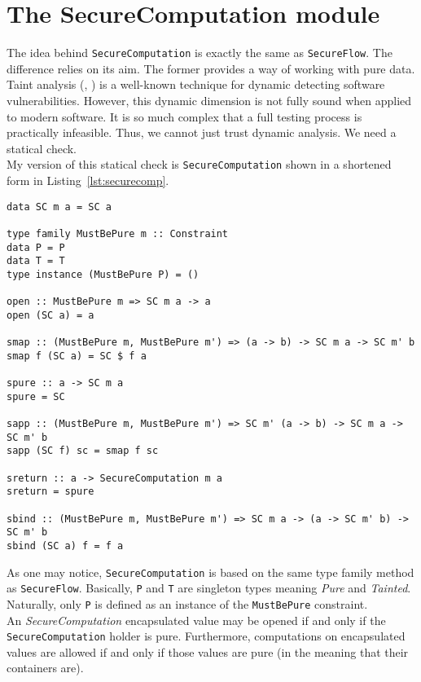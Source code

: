 \section{The SecureComputation module}\label{sec:computation}
The idea behind \texttt{SecureComputation} is exactly the same as \texttt{SecureFlow}. The difference relies on its aim. The former provides a way of working with pure data. \\
Taint analysis (\cite{schwartz2010all}, \cite{newsome2005dynamic}) is a well-known technique for dynamic detecting software vulnerabilities. However, this dynamic dimension is not fully sound when applied to modern software. It is so much complex that a full testing process is practically infeasible. Thus, we cannot just trust dynamic analysis. We need a statical check. \\
My version of this statical check is \texttt{SecureComputation} shown in a shortened form in Listing~\ref{lst:securecomp}.
\begin{lstlisting}[caption={SecureComputation module}, label={lst:securecomp}, breaklines=true]
data SC m a = SC a

type family MustBePure m :: Constraint
data P = P
data T = T
type instance (MustBePure P) = ()

open :: MustBePure m => SC m a -> a
open (SC a) = a

smap :: (MustBePure m, MustBePure m') => (a -> b) -> SC m a -> SC m' b
smap f (SC a) = SC $ f a

spure :: a -> SC m a
spure = SC

sapp :: (MustBePure m, MustBePure m') => SC m' (a -> b) -> SC m a -> SC m' b
sapp (SC f) sc = smap f sc

sreturn :: a -> SecureComputation m a
sreturn = spure

sbind :: (MustBePure m, MustBePure m') => SC m a -> (a -> SC m' b) -> SC m' b
sbind (SC a) f = f a
\end{lstlisting}
As one may notice, \texttt{SecureComputation} is based on the same type family method as \texttt{SecureFlow}. Basically, \texttt{P} and \texttt{T} are singleton types meaning \textit{Pure} and \textit{Tainted}. Naturally, only \texttt{P} is defined as an instance of the \texttt{MustBePure} constraint. \\
An \textit{SecureComputation} encapsulated value may be opened if and only if the \texttt{SecureComputation} holder is pure. Furthermore, computations on encapsulated values are allowed if and only if those values are pure (in the meaning that their containers are). \\
